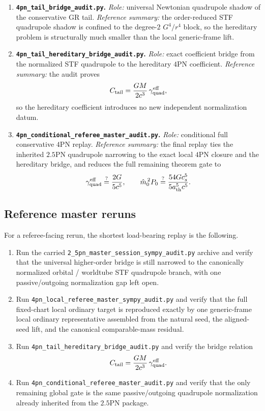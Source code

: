 \documentclass[11pt]{article}
\begin{document}
\begin{enumerate}
  \item \textbf{\nolinkurl{4pn_tail_bridge_audit.py}.}  \emph{Role:}
  universal Newtonian quadrupole shadow of the conservative GR tail.
  \emph{Reference summary:} the order-reduced STF quadrupole shadow is confined
  to the degree-$2$ $G^4/r^4$ block, so the hereditary problem is structurally
  much smaller than the local generic-frame lift.

  \item \textbf{\nolinkurl{4pn_tail_hereditary_bridge_audit.py}.}
  \emph{Role:} exact coefficient bridge from the normalized STF quadrupole to
  the hereditary $4$PN coefficient.  \emph{Reference summary:} the audit proves
  \[
  C_{\rm tail}=\frac{GM}{2c^3}\,\gamma_{\rm quad}^{\rm eff},
  \]
  so the hereditary coefficient introduces no new independent normalization
  datum.

  \item \textbf{\nolinkurl{4pn_conditional_referee_master_audit.py}.}
  \emph{Role:} conditional full conservative $4$PN replay.  \emph{Reference
  summary:} the final replay ties the inherited $2.5$PN quadrupole narrowing to
  the exact local $4$PN closure and the hereditary bridge, and reduces the full
  remaining theorem gate to
  \[
  \gamma_{\rm quad}^{\rm eff}\stackrel{?}{=}\frac{2G}{5c^5},
  \qquad
  \hat m_0^{\,2}P_0\stackrel{?}{=}\frac{54Gc_s^5}{5a_{\rm th}^5c^5}.
  \]
\end{enumerate}

\subsection{Reference master reruns}
\label{app:verification-reference-runs}

For a referee-facing rerun, the shortest load-bearing replay is the following.

\begin{enumerate}
  \item Run the carried \texttt{2\_5pn\_master\_session\_sympy\_audit.py}
  archive and verify that the universal higher-order bridge is still narrowed to
  the canonically normalized orbital / worldtube STF quadrupole branch, with one
  passive/outgoing normalization gap left open.

  \item Run \texttt{4pn\_local\_referee\_master\_sympy\_audit.py} and verify
  that the full fixed-chart local ordinary target is reproduced exactly by one
  generic-frame local ordinary representative assembled from the natural seed,
  the aligned-seed lift, and the canonical comparable-mass residual.

  \item Run \texttt{4pn\_tail\_hereditary\_bridge\_audit.py} and verify the
  bridge relation
  \[
  C_{\rm tail}=\frac{GM}{2c^3}\,\gamma_{\rm quad}^{\rm eff}.
  \]

  \item Run \texttt{4pn\_conditional\_referee\_master\_audit.py} and verify
  that the only remaining global gate is the same passive/outgoing quadrupole
  normalization already inherited from the $2.5$PN package.
\end{enumerate}
\end{document}

